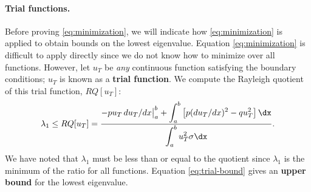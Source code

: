 \paragraph{Trial functions.}
Before proving \eqref{eq:minimization}, we will indicate how \eqref{eq:minimization} is applied to obtain bounds on the lowest eigenvalue.  Equation \eqref{eq:minimization} is difficult to apply directly since we do not know how to minimize over all functions.  However, let $u_T$ be \textit{any} continuous function satisfying the boundary conditions; $u_T$ is known as a \textbf{trial function}.  We compute the Rayleigh quotient of this trial function, $RQ[u_T]$:
\begin{equation}
\label{eq:trial-bound}
\lambda_1 \le RQ[u_T] = \frac{\displaystyle -pu_T\,du_T/dx\big|_a^b + \int_a^b \left[p(du_T/dx)^2 - qu_T^2\right]\dx}{\displaystyle\int_a^b u_T^2\sigma\dx}.
\end{equation}
We have noted that $\lambda_1$ must be less than or equal to the quotient since $\lambda_1$ is the minimum of the ratio for all functions.  Equation \eqref{eq:trial-bound} gives an \textbf{upper bound} for the lowest eigenvalue.

